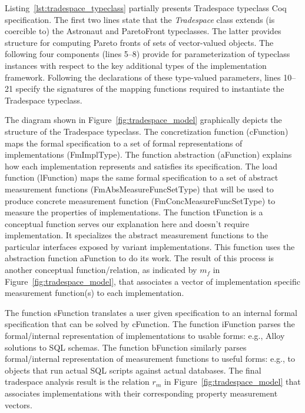 \documentclass[10pt,conference]{IEEEtran}
\begin{document}
Listing~\ref{lst:tradespace_typeclass} partially presents Tradespace typeclass Coq specification. 
The first two lines state that the {\em Tradespace} class extends (is coercible to) the Astronaut and ParetoFront typeclasses. The latter provides structure for computing Pareto fronts of sets of vector-valued objects. The following four components (lines 5--8) provide for parameterization of typeclass instances with respect to the key additional types of the implementation framework. Following the declarations of these type-valued parameters, lines 10--21 specify the signatures of the mapping functions required to instantiate the Tradespace typeclass.

The diagram shown in Figure~\ref{fig:tradespace_model} graphically depicts the structure of the Tradespace typeclass.
The concretization function (\textsf{cFunction}) maps the formal specification to a set of formal representations of implementations (\textsf{FmImplType}). The function abstraction (\textsf{aFunction}) explains how each implementation represents and satisfies its specification. The load function (\textsf{lFunction}) maps the same formal specification to a set of abstract measurement functions (\textsf{FmAbsMeasureFuncSetType}) that will be used to produce concrete measurement function (\textsf{FmConcMeasureFuncSetType}) to measure the properties of implementations. The function \textsf{tFunction} is a conceptual function serves our explanation here and doesn't require implementation. It specializes the abstract measurement functions to the particular interfaces exposed by variant implementations. This function uses the abstraction function \textsf{aFunction} to do its work. The result of this process is another conceptual function/relation, as indicated by $m_f$ in Figure~\ref{fig:tradespace_model}, that associates a vector of implementation specific measurement function(s) to each implementation. 

The function \textsf{sFunction} translates a user given specification to an internal formal specification that can be solved by \textsf{cFunction}. The function \textsf{iFunction} parses the formal/internal representation of implementations to usable forms: e.g., Alloy solutions to SQL schemas. The function \textsf{bFunction} similarly parses formal/internal representation of measurement functions to useful forms: e.g., to objects that run actual SQL scripts against actual databases. The final tradespace analysis result is the relation $r_m$ in Figure~\ref{fig:tradespace_model} that associates implementations with their corresponding property measurement vectors.
\end{document}
